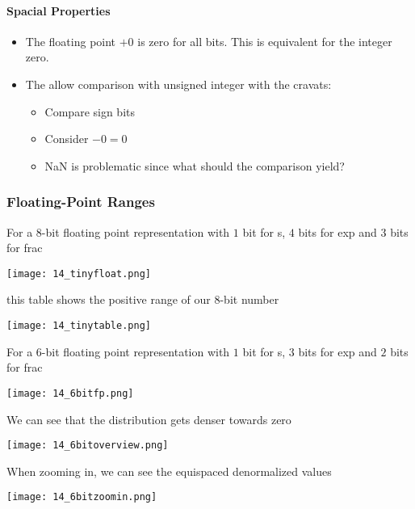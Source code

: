 \paragraph{Spacial Properties}
\begin{itemize}
    \item The floating point $+0$ is zero for all bits. This is equivalent for the integer zero.
    \item The allow comparison with unsigned integer with the cravats:
        \begin{itemize}
            \item Compare sign bits
            \item Consider $-0 = 0$
            \item NaN is problematic since what should the comparison yield?
        \end{itemize}
\end{itemize}

\subsubsection{Floating-Point Ranges}
For a $8$-bit floating point representation with $1$ bit for s, $4$ bits for exp and $3$ bits for frac

\texttt{[image: 14\_tinyfloat.png]}

this table shows the positive range of our $8$-bit number

\texttt{[image: 14\_tinytable.png]}

For a $6$-bit floating point representation with $1$ bit for s, $3$ bits for exp and $2$ bits for frac

\texttt{[image: 14\_6bitfp.png]}

We can see that the distribution gets denser towards zero

\texttt{[image: 14\_6bitoverview.png]}

When zooming in, we can see the equispaced denormalized values

\texttt{[image: 14\_6bitzoomin.png]}

